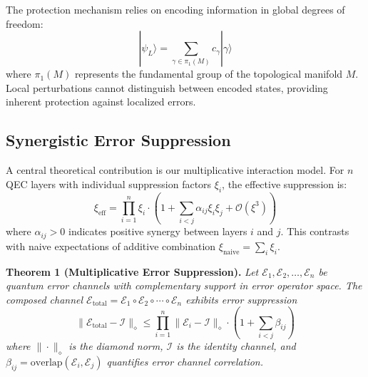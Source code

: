 \documentclass[12pt,a4paper]{article}
\theoremstyle{definition}
\begin{document}
The protection mechanism relies on encoding information in global degrees of freedom:
\begin{equation}
|\psi_L\rangle = \sum_{\gamma \in \pi_1(M)} c_\gamma |\gamma\rangle
\end{equation}
where $\pi_1(M)$ represents the fundamental group of the topological manifold $M$. Local perturbations cannot distinguish between encoded states, providing inherent protection against localized errors.

\subsection{Synergistic Error Suppression}
A central theoretical contribution is our multiplicative interaction model. For $n$ QEC layers with individual suppression factors $\xi_i$, the effective suppression is:
\begin{equation}
\xi_{\text{eff}} = \prod_{i=1}^{n} \xi_i \cdot \left(1 + \sum_{i<j} \alpha_{ij} \xi_i \xi_j + \mathcal{O}(\xi^3)\right)
\label{eq:synergy}
\end{equation}
where $\alpha_{ij} > 0$ indicates positive synergy between layers $i$ and $j$. This contrasts with naive expectations of additive combination $\xi_{\text{naive}} = \sum_i \xi_i$.

\textbf{Theorem 1 (Multiplicative Error Suppression).} \textit{Let $\mathcal{E}_1, \mathcal{E}_2, \ldots, \mathcal{E}_n$ be quantum error channels with complementary support in error operator space. The composed channel $\mathcal{E}_{\text{total}} = \mathcal{E}_1 \circ \mathcal{E}_2 \circ \cdots \circ \mathcal{E}_n$ exhibits error suppression}
\begin{equation}
\|\mathcal{E}_{\text{total}} - \mathcal{I}\|_{\diamond} \leq \prod_{i=1}^{n} \|\mathcal{E}_i - \mathcal{I}\|_{\diamond} \cdot \left(1 + \sum_{i<j} \beta_{ij}\right)
\end{equation}
\textit{where $\|\cdot\|_{\diamond}$ is the diamond norm, $\mathcal{I}$ is the identity channel, and $\beta_{ij} = \text{overlap}(\mathcal{E}_i, \mathcal{E}_j)$ quantifies error channel correlation.}
\end{document}
